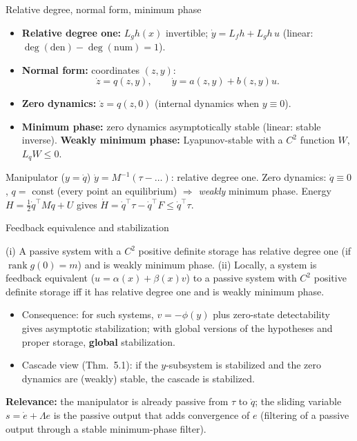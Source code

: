 \documentclass[aspectratio=169,10pt]{beamer}
\newcommand{\dq}{\dot q}
\begin{document}
\begin{frame}{Relative degree, normal form, minimum phase}
\begin{itemize}
\item \textbf{Relative degree one:} $L_gh(x)$ invertible; $\dot y=L_fh+L_gh\,u$ (linear: $\deg(\text{den})-\deg(\text{num})=1$).
\item \textbf{Normal form:} coordinates $(z,y)$:
\[\dot z=q(z,y),\qquad \dot y=a(z,y)+b(z,y)u .\]
\item \textbf{Zero dynamics:} $\dot z=q(z,0)$ (internal dynamics when $y\equiv0$).
\item \textbf{Minimum phase:} zero dynamics asymptotically stable (linear: stable inverse). \textbf{Weakly minimum phase:} Lyapunov-stable with a $C^2$ function $W$, $L_{q}W\le0$.
\end{itemize}
\begin{block}{Manipulator ($y=\dq$)}
$\dot y=M^{-1}(\tau-\dots)$: relative degree one. Zero dynamics: $\dq\equiv0$, $q=$ const (every point an equilibrium) $\Rightarrow$ \emph{weakly} minimum phase. Energy $H=\tfrac12\dq^\top M\dq+U$ gives $\dot H=\dq^\top\tau-\dq^\top F\le\dq^\top\tau$.
\end{block}
\end{frame}

\begin{frame}{Feedback equivalence and stabilization}
\begin{theorem}[BIW 1991]
(i) A passive system with a $C^2$ positive definite storage has relative degree one (if $\operatorname{rank}g(0)=m$) and is weakly minimum phase. (ii) Locally, a system is feedback equivalent ($u=\alpha(x)+\beta(x)v$) to a passive system with $C^2$ positive definite storage iff it has relative degree one and is weakly minimum phase.
\end{theorem}
\begin{itemize}
\item Consequence: for such systems, $v=-\phi(y)$ plus zero-state detectability gives asymptotic stabilization; with global versions of the hypotheses and proper storage, \textbf{global} stabilization.
\item Cascade view (Thm.\ 5.1): if the $y$-subsystem is stabilized and the zero dynamics are (weakly) stable, the cascade is stabilized.
\end{itemize}
\textbf{Relevance:} the manipulator is already passive from $\tau$ to $\dq$; the sliding variable $s=\dot e+\Lambda e$ is the passive output that adds convergence of $e$ (filtering of a passive output through a stable minimum-phase filter).
\end{frame}
\end{document}
